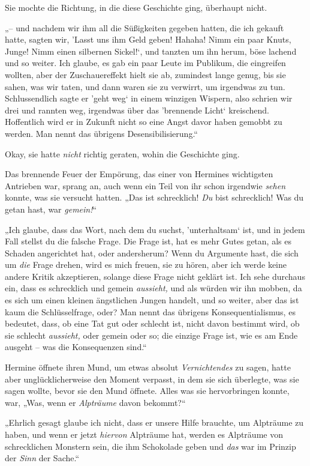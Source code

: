 {Sie mochte die Richtung, in die diese Geschichte ging, überhaupt nicht.

„-- und nachdem wir ihm all die Süßigkeiten gegeben hatten, die ich gekauft hatte, sagten wir, 'Lasst uns ihm Geld geben! Hahaha! Nimm ein paar Knuts, Junge! Nimm einen silbernen Sickel!`, und tanzten um ihn herum, böse lachend und so weiter. Ich glaube, es gab ein paar Leute im Publikum, die eingreifen wollten, aber der Zuschauereffekt hielt sie ab, zumindest lange genug, bis sie sahen, was wir taten, und dann waren sie zu verwirrt, um irgendwas zu tun. Schlussendlich sagte er 'geht weg` in einem winzigen Wispern, also schrien wir drei und rannten weg, irgendwas über das 'brennende Licht` kreischend. Hoffentlich wird er in Zukunft nicht so eine Angst davor haben gemobbt zu werden. Man nennt das übrigens Desensibilisierung.“

Okay, sie hatte \emph{nicht} richtig geraten, wohin die Geschichte ging.

Das brennende Feuer der Empörung, das einer von Hermines wichtigsten Antrieben war, sprang an, auch wenn ein Teil von ihr schon irgendwie \emph{sehen} konnte, was sie versucht hatten. „Das ist schrecklich! \emph{Du} bist schrecklich! Was du getan hast, war \emph{gemein!}“

„Ich glaube, dass das Wort, nach dem du suchst, 'unterhaltsam` ist, und in jedem Fall stellst du die falsche Frage. Die Frage ist, hat es mehr Gutes getan, als es Schaden angerichtet hat, oder andersherum? Wenn du Argumente hast, die sich um \emph{die} Frage drehen, wird es mich freuen, sie zu hören, aber ich werde keine andere Kritik akzeptieren, solange diese Frage nicht geklärt ist. Ich sehe durchaus ein, dass es schrecklich und gemein \emph{aussieht,} und als würden wir ihn mobben, da es sich um einen kleinen ängstlichen Jungen handelt, und so weiter, aber das ist kaum die Schlüsselfrage, oder? Man nennt das übrigens Konsequentialismus, es bedeutet, dass, ob eine Tat gut oder schlecht ist, nicht davon bestimmt wird, ob sie schlecht \emph{aussieht,} oder gemein oder so; die einzige Frage ist, wie es am Ende ausgeht -- was die Konsequenzen sind.“

Hermine öffnete ihren Mund, um etwas absolut \emph{Vernichtendes} zu sagen, hatte aber unglücklicherweise den Moment verpasst, in dem sie sich überlegte, was sie sagen wollte, bevor sie den Mund öffnete. Alles was sie hervorbringen konnte, war, „Was, wenn er \emph{Alpträume} davon bekommt?“

„Ehrlich gesagt glaube ich nicht, dass er unsere Hilfe brauchte, um Alpträume zu haben, und wenn er jetzt \emph{hiervon} Alpträume hat, werden es Alpträume von schrecklichen Monstern sein, die ihm Schokolade geben und \emph{das} war im Prinzip der \emph{Sinn} der Sache.“

}

